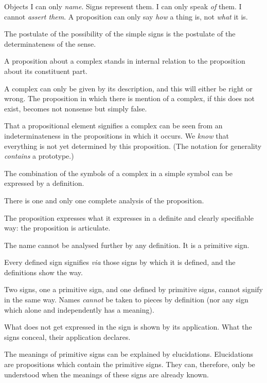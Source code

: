 {Objects I can only \emph{name}. Signs represent them.
I can only speak \emph{of} them. I cannot \emph{assert them}.
A proposition can only say \emph{how} a thing is, not
\emph{what} it is.}


{The postulate of the possibility of the simple
signs is the postulate of the determinateness of
the sense.}


{A proposition about a complex stands in
internal relation to the proposition about its
constituent part.

A complex can only be given by its description,
and this will either be right or wrong. The proposition
in which there is mention of a complex,
if this does not exist, becomes not nonsense but
simply false.

That a propositional element signifies a complex
can be seen from an indeterminateness in the propositions
in which it occurs. We \emph{know} that everything
is not yet determined by this proposition.
(The notation for generality \emph{contains} a prototype.)

The combination of the symbols of a complex
in a simple symbol can be expressed by a definition.}


{There is one and only one complete analysis of
the proposition.}


{The proposition expresses what it expresses in
a definite and clearly specifiable way: the proposition
is articulate.}


{The name cannot be analysed further by any
definition. It is a primitive sign.}


{Every defined sign signifies \emph{via} those signs
by which it is defined, and the definitions show
the way.

Two signs, one a primitive sign, and one
defined by primitive signs, cannot signify in the
same way. Names \emph{cannot} be taken to pieces by
definition (nor any sign which alone and independently
has a meaning).}


{What does not get expressed in the sign is
shown by its application. What the signs conceal,
their application declares.}


{The meanings of primitive signs can be
explained by elucidations. Elucidations are propositions
which contain the primitive signs. They
can, therefore, only be understood when the
meanings of these signs are already known.}


